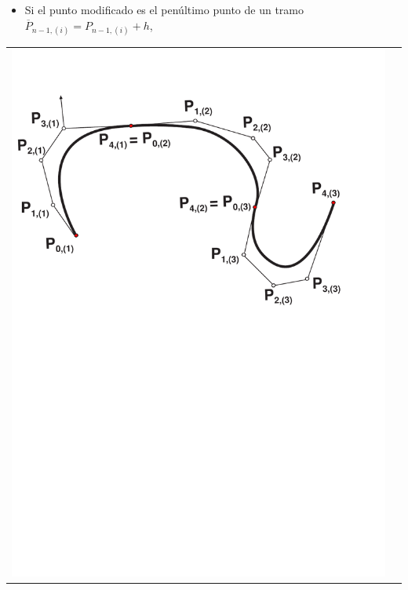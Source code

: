 \documentclass[ebook,oneside]{memoir}
\begin{document}
\begin{itemize}
\item Si el punto modificado es el pen\'{u}ltimo punto de un tramo $\overline{P}_{n-1,(i)}=P_{n-1,(i)}+h$,
\end{itemize}

\begin{center}
\begin{tabular}{cc}
\includegraphics[scale=0.45]{3_22a.pdf} \\

\end{tabular}
\end{center}
\end{document}
